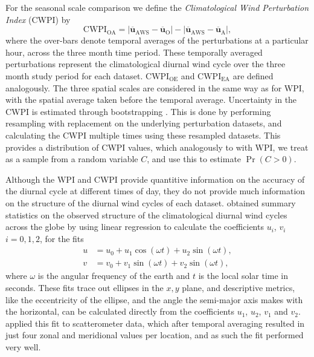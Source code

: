 \documentclass{ametsoc}
\DeclareMathOperator{\pr}{Pr}
\begin{document}
For the seasonal scale comparison we define the \textit{Climatological Wind Perturbation Index} (CWPI) by
\begin{equation}
\text{CWPI}_{\text{OA}} = \left\lvert \overline{\boldsymbol{u}}_{\text{AWS}}-\overline{\boldsymbol{u}}_{\text{O}} \right\rvert - \left\lvert \overline{\boldsymbol{u}}_{\text{AWS}}-\overline{\boldsymbol{u}}_{\text{A}} \right\rvert,
\end{equation}
where the over-bars denote temporal averages of the perturbations at a particular hour, across the three month time period. These temporally averaged perturbations represent the climatological diurnal wind cycle over the three month study period for each dataset. $\text{CWPI}_{\text{OE}}$ and $\text{CWPI}_{\text{EA}}$ are defined analogously. The three spatial scales are considered in the same way as for WPI, with the spatial average taken before the temporal average. Uncertainty in the CWPI is estimated through bootstrapping \citep{efron79}. This is done by performing resampling with replacement on the underlying perturbation datasets, and calculating the CWPI multiple times using these resampled datasets. This provides a distribution of CWPI values, which analogously to with WPI, we treat as a sample from a random variable $C$, and use this to estimate $\pr\left(C > 0\right)$.

Although the WPI and CWPI provide quantitive information on the accuracy of the diurnal cycle at different times of day, they do not provide much information on the structure of the diurnal wind cycles of each dataset. \citet{gille05} obtained summary statistics on the observed structure of the climatological diurnal wind cycles across the globe by using linear regression to calculate the coefficients $u_i$, $v_i$ $i=0,1,2$, for the fits 
\begin{align}
u &= u_0 + u_1 \cos(\omega t) + u_2 \sin(\omega t), \label{Eq:u_h} \\
v &= v_0 + v_1 \sin(\omega t) + v_2 \sin(\omega t), \label{Eq:v_h}
\end{align}
where $\omega$ is the angular frequency of the earth and $t$ is the local solar time in seconds. These fits trace out ellipses in the $x,y$ plane, and descriptive metrics, like the eccentricity of the ellipse, and the angle the semi-major axis makes with the horizontal, can be calculated directly from the coefficients $u_1$, $u_2$, $v_1$ and $v_2$. \citet{gille05} applied this fit to scatterometer data, which after temporal averaging resulted in just four zonal and meridional values per location, and as such the fit performed very well.  
\end{document}
